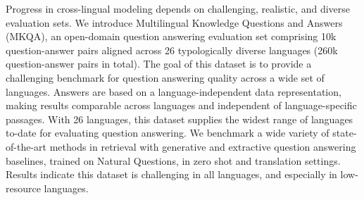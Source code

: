 Progress in cross-lingual modeling depends on challenging, realistic, and diverse evaluation sets. We introduce Multilingual Knowledge Questions and Answers (MKQA), an open-domain question answering evaluation set comprising 10k question-answer pairs aligned across 26 typologically diverse languages (260k question-answer pairs in total). The goal of this dataset is to provide a challenging benchmark for question answering quality across a wide set of languages. Answers are based on a language-independent data representation, making results comparable across languages and independent of language-specific passages. With 26 languages, this dataset supplies the widest range of languages to-date for evaluating question answering. We benchmark a wide variety of state-of-the-art methods in retrieval with generative and extractive question answering baselines, trained on Natural Questions, in zero shot and translation settings. Results indicate this dataset is challenging in all languages, and especially in low-resource languages.